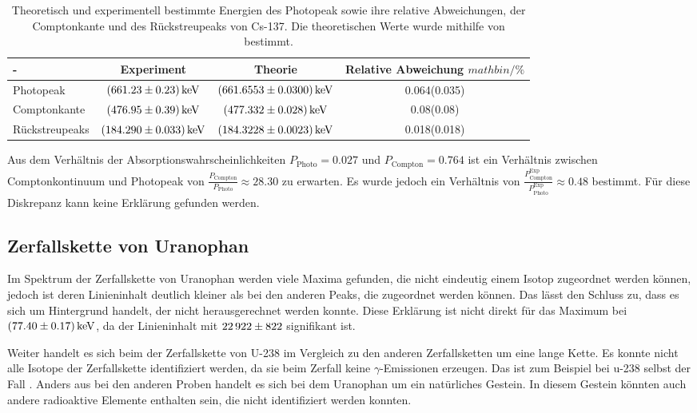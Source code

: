 \begin{table}
    \centering
    \caption{Theoretisch und experimentell bestimmte Energien des Photopeak sowie ihre relative Abweichungen, der Comptonkante und des Rückstreupeaks von Cs-137. Die theoretischen Werte wurde mithilfe von \cite{LNHB} bestimmt.}
    \label{tab:CaesiumEnergienVergleich}
    \begin{tabular}{l S[table-format=3.2(4), separate-uncertainty] S[table-format=3.4(4), separate-uncertainty]  S[table-format=1.3(4)]}
        \toprule
        {-} & {Experiment} & {Theorie} & {Relative Abweichung $ mathbin{/} \%$}\\
        \midrule 
        Photopeak       & $\SI{661.23 \pm 0.23 }{\kilo\eV}$ & $\SI{661.6553 \pm 0.030}{\kilo\eV}$      & 0.064(0.035) \\ 
        Comptonkante    & $\SI{476.95 \pm 0.39 }{\kilo\eV}$ & $\SI{477.332 \pm 0.028}{\kilo\eV}$       & 0.08(0.08) \\ 
        Rückstreupeaks  & $\SI{184.290 \pm 0.033 }{\kilo\eV}$ & $\SI{184.3228 \pm 0.0023}{\kilo\eV}$   & 0.018(0.018) \\ 
        \bottomrule
    \end{tabular}
\end{table}

Aus dem Verhältnis der Absorptionswahrscheinlichkeiten $P_\text{Photo} = \num{0.027}$ und $P_\text{Compton} = \num{0.764}$ 
ist ein Verhältnis zwischen Comptonkontinuum und Photopeak von $\frac{P_\text{Compton}}{P_\text{Photo}} \approx 28.30$ zu erwarten.
Es wurde jedoch ein Verhältnis von $\frac{P^{\text{Exp}}_\text{Compton}}{P^{\text{Exp}}_\text{Photo}} \approx 0.48$ bestimmt.
Für diese Diskrepanz kann keine Erklärung gefunden werden.


\subsection{Zerfallskette von Uranophan}

Im Spektrum der  Zerfallskette von Uranophan werden viele Maxima gefunden, die nicht eindeutig einem Isotop zugeordnet werden können,
jedoch ist deren Linieninhalt deutlich kleiner als bei den anderen Peaks, die zugeordnet werden können.
Das lässt den Schluss zu, dass es sich um Hintergrund handelt, der nicht herausgerechnet werden konnte.
Diese Erklärung ist nicht direkt für das Maximum bei $\SI{77.40 \pm 0.17}{\kilo\eV}$, da der Linieninhalt mit $\num{22 922 \pm 822}$ signifikant ist.

Weiter handelt es sich beim der Zerfallskette von U-238 im Vergleich zu den anderen Zerfallsketten um eine lange Kette.
Es konnte nicht alle Isotope der Zerfallskette identifiziert werden, da sie beim Zerfall keine $\gamma$-Emissionen erzeugen.
Das ist zum Beispiel bei u-238 selbst der Fall \cite{LNHB}. 
Anders aus bei den anderen Proben handelt es sich bei dem Uranophan um ein natürliches Gestein.
In diesem Gestein könnten auch andere radioaktive Elemente enthalten sein, die nicht identifiziert werden konnten. 
